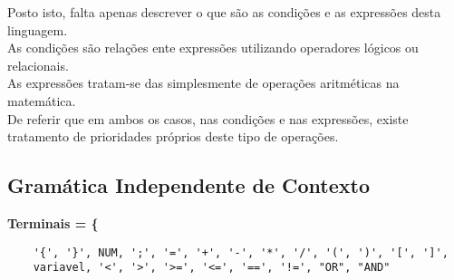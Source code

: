 \documentclass{report}
\begin{document}
Posto isto, falta apenas descrever o que são as condições e as expressões desta linguagem. \\As condições são relações ente expressões utilizando operadores lógicos ou relacionais.\\As expressões tratam-se das simplesmente de operações aritméticas na matemática.\\De referir que em ambos os casos, nas condições e nas expressões, existe tratamento de prioridades próprios deste tipo de operações.








\subsection{Gramática Independente de Contexto}

\textbf{Terminais = \{}
\begin{verbatim}
    '{', '}', NUM, ';', '=', '+', '-', '*', '/', '(', ')', '[', ']',
    variavel, '<', '>', '>=', '<=', '==', '!=', "OR", "AND"
\end{verbatim}{} 
\end{document}
